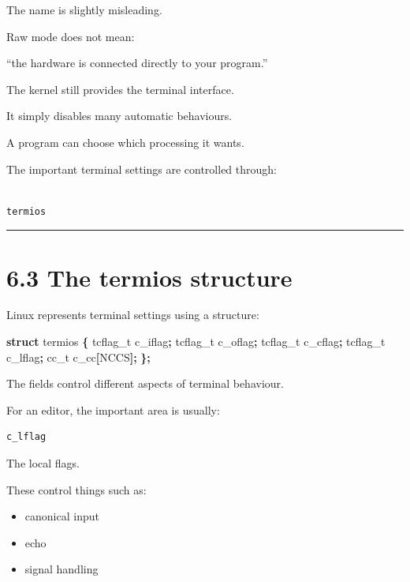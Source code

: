 \documentclass[
  oneside,
  openany]{book}
\newenvironment{Shaded}{\begin{snugshade}}{\end{snugshade}}
\newcommand{\KeywordTok}[1]{\textcolor[rgb]{0.13,0.29,0.53}{\textbf{#1}}}
\newcommand{\NormalTok}[1]{#1}
\newcommand{\OperatorTok}[1]{\textcolor[rgb]{0.81,0.36,0.00}{\textbf{#1}}}
\providecommand{\tightlist}{%
  \setlength{\itemsep}{0pt}\setlength{\parskip}{0pt}}
\begin{document}
The name is slightly misleading.

Raw mode does not mean:

``the hardware is connected directly to your program.''

The kernel still provides the terminal interface.

It simply disables many automatic behaviours.

A program can choose which processing it wants.

The important terminal settings are controlled through:

\begin{verbatim}

termios
\end{verbatim}

\begin{center}\rule{0.5\linewidth}{0.5pt}\end{center}

\hypertarget{the-termios-structure}{%
\section{6.3 The termios structure}\label{the-termios-structure}}

Linux represents terminal settings using a structure:

\begin{Shaded}
\begin{Highlighting}[]
\KeywordTok{struct}\NormalTok{ termios }\OperatorTok{\{}
\NormalTok{    tcflag\_t c\_iflag}\OperatorTok{;}
\NormalTok{    tcflag\_t c\_oflag}\OperatorTok{;}
\NormalTok{    tcflag\_t c\_cflag}\OperatorTok{;}
\NormalTok{    tcflag\_t c\_lflag}\OperatorTok{;}
\NormalTok{    cc\_t c\_cc}\OperatorTok{[}\NormalTok{NCCS}\OperatorTok{];}
\OperatorTok{\};}
\end{Highlighting}
\end{Shaded}

The fields control different aspects of terminal behaviour.

For an editor, the important area is usually:

\begin{verbatim}
c_lflag
\end{verbatim}

The local flags.

These control things such as:

\begin{itemize}
\tightlist
\item
  canonical input
\item
  echo
\item
  signal handling
\end{itemize}
\end{document}
